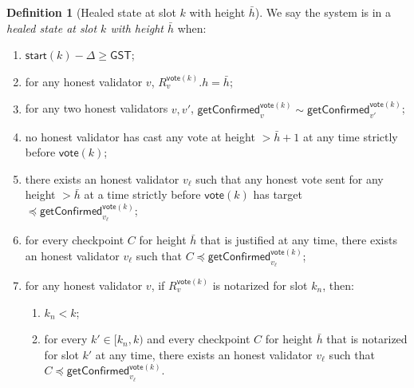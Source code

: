 \documentclass{article}
\newcommand{\start}{\mathsf{start}}
\newcommand{\vote}{\mathsf{vote}}
\newcommand{\comm}[1]{\bar{#1}}
\newcommand{\getConfirmed}{\textsf{getConfirmed}\xspace}
\theoremstyle{plain}
\theoremstyle{definition}
\newtheorem{definition}[theorem]{Definition}
\theoremstyle{remark}
\newcommand{\GST}{\ensuremath{\mathsf{GST}}}
\begin{document}
\begin{definition}[Healed state at slot $k$ with height $\comm{h}$]\label{rev:def:healed-state}
We say the system is in a \emph{healed state at slot $k$ with height $\comm{h}$} when:
\begin{enumerate}
  \item\label{rev:def:healed-state:sync} $\start(k) - \Delta \geq \GST$;
  \item\label{rev:def:healed-state:R} for any honest validator $v$, $R_v^{\vote(k)}.h = \comm{h}$;
  \item\label{rev:def:healed-state:gt-compat} for any two honest validators $v, v'$, $\getConfirmed_v^{\vote(k)} \sim \getConfirmed_{v'}^{\vote(k)}$;
  \item\label{rev:def:healed-state:no-just} no honest validator has cast any vote at height $> \comm{h}+1$ at any time strictly before $\vote(k)$;
  \item\label{rev:def:healed-state:target-cap} there exists an honest validator $v_\ell$ such that any honest vote sent for any height $> \comm{h}$ at a time strictly before $\vote(k)$ has target $\preceq \getConfirmed_{v_\ell}^{\vote(k)}$;
  \item\label{rev:def:healed-state:just-bound} for every checkpoint $C$ for height $\comm{h}$ that is justified at any time, there exists an honest validator $v_\ell$ such that $C \preceq \getConfirmed_{v_\ell}^{\vote(k)}$;
  \item\label{rev:def:healed-state:notar-bound} for any honest validator $v$, if $R_v^{\vote(k)}$ is notarized for slot $k_n$, then:
  \begin{enumerate}
    \item\label{rev:def:healed-state:notar-bound:past} $k_n < k$;
    \item\label{rev:def:healed-state:notar-bound:coverage} for every $k' \in [k_n, k)$ and every checkpoint $C$ for height $\comm{h}$ that is notarized for slot $k'$ at any time, there exists an honest validator $v_\ell$ such that $C \preceq \getConfirmed_{v_\ell}^{\vote(k)}$.
  \end{enumerate}
\end{enumerate}
\end{definition}
\end{document}
